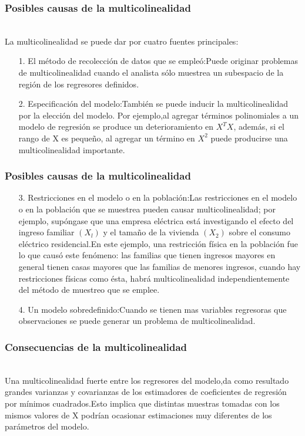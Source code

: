 \documentclass[12pt]{beamer}
\begin{document}
\begin{frame}
\frametitle{Posibles causas de la multicolinealidad}
~\\La multicolinealidad se puede dar por cuatro fuentes principales:
\begin{itemize}
\item[1.]El método de recolección de datos que se empleó:Puede originar problemas de multicolinealidad cuando el analista sólo muestrea un subespacio de la región de los regresores definidos.
\item[2.]Especificación del modelo:También se puede inducir la multicolinealidad por la elección del modelo. Por ejemplo,al agregar términos polinomiales a un modelo de regresión se produce un deterioramiento en $X^{T}X$, además, si el rango de X es pequeño, al agregar un término en $X^{2}$ puede producirse una multicolinealidad importante.
\end{itemize}
\end{frame}

\begin{frame}
\frametitle{Posibles causas de la multicolinealidad}
\begin{itemize}
\item[3.]Restricciones en el modelo o en la población:Las restricciones en el modelo o en la población que se muestrea pueden causar multicolinealidad; por ejemplo, supóngase que una empresa eléctrica está investigando el efecto del ingreso familiar $(X_{l})$ y el tamaño de la vivienda $(X_{2})$ sobre el consumo eléctrico residencial.En este ejemplo, una restricción física en la población fue lo que causó este fenómeno: las familias que tienen ingresos mayores en general tienen casas mayores que las familias de menores ingresos, cuando hay restricciones físicas como ésta, habrá multicolinealidad independientemente del método de muestreo que se emplee.
\item[4.]Un modelo sobredefinido:Cuando se tienen mas variables regresoras que observaciones se puede generar un problema de multicolinealidad.
\end{itemize}
\end{frame}


\begin{frame}
\frametitle{Consecuencias de la multicolinealidad}
~\\Una multicolinealidad fuerte entre los regresores del modelo,da como resultado grandes varianzas y covarianzas de los estimadores de coeficientes de regresión por mínimos cuadrados.Esto implica que distintas muestras tomadas con los mismos valores de X podrían ocasionar estimaciones muy diferentes de los parámetros del modelo.
\end{frame}
\end{document}
